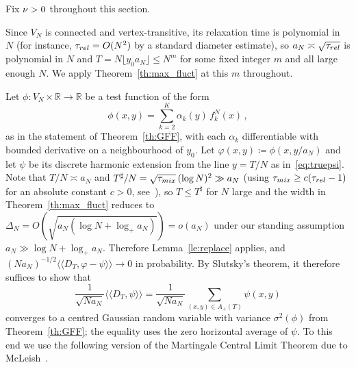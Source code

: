 \documentclass[11pt,a4paper,reqno]{amsart}
\theoremstyle{definition}
\newcommand{\bbR}{{\ensuremath{\mathbb R}} }
\newcommand{\laa}{\langle \! \langle}
\newcommand{\raa}{\rangle \! \rangle}
\begin{document}
Fix $\nu > 0$ throughout this section.

Since $V_N$ is connected and vertex-transitive, its relaxation time is polynomial in $N$ (for instance, $\tau_{rel} = O(N^2)$ by a standard diameter estimate), so $a_N \asymp \sqrt{\tau_{rel}}$ is polynomial in $N$ and $T = N\lfloor y_0 a_N\rfloor \leq N^m$ for some fixed integer $m$ and all large enough $N$. We apply Theorem~\ref{th:max_fluct} at this $m$ throughout.

Let $\phi : V_N \times \bbR \to \bbR$ be a test function of the form
$$ \phi(x, y) = \sum_{k=2}^K \alpha_k(y)\, f_k^N(x)\,, $$
as in the statement of Theorem~\ref{th:GFF}, with each $\alpha_k$ differentiable with bounded derivative on a neighbourhood of $y_0$. Let $\varphi(x, y) \coloneqq \phi(x, y/a_N)$ and let $\psi$ be its discrete harmonic extension from the line $y = T/N$ as in~\eqref{eq:truepsi}. Note that $T/N \asymp a_N$ and $T^\sharp/N = \sqrt{\tau_{mix}}\,(\log N)^2 \gg a_N$ (using $\tau_{mix} \geq c(\tau_{rel} - 1)$ for an absolute constant $c > 0$, see~\cite{levin2017markov}), so $T \leq T^\sharp$ for $N$ large and the width in Theorem~\ref{th:max_fluct} reduces to $\Delta_N = O(\sqrt{a_N(\log N + \log_+ a_N)}) = o(a_N)$ under our standing assumption $a_N \gg \log N + \log_+ a_N$. Therefore Lemma~\ref{le:replace} applies, and $(Na_N)^{-1/2}\laa D_T, \varphi - \psi\raa \to 0$ in probability. By Slutsky's theorem, it therefore suffices to show that
	\[  \frac{1}{\sqrt{N a_N}} \laa D_T, \psi \raa = \frac{1}{\sqrt{N a_N}} \sum_{(x,y) \in A_+(T)} \psi (x,y)\]
converges to a centred Gaussian random variable with variance $\sigma^2(\phi)$ from Theorem~\ref{th:GFF}; the equality uses the zero horizontal average of $\psi$. To this end we use the following version of the Martingale Central Limit Theorem due to McLeish~\cite{mcleish1974dependent}.
\end{document}
